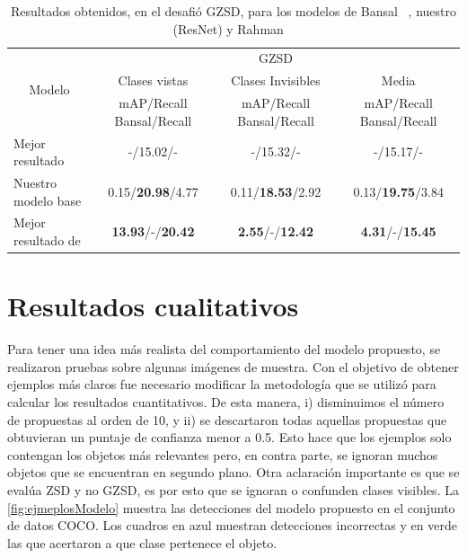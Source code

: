 \begin{table}[]
	\centering
	\resizebox{\textwidth}{!} {
		\begin{tabular}{|l|c|c|c|}
			\hline
			\multicolumn{1}{|c|}{\multirow{3}{*}{Modelo}} & \multicolumn{3}{c|}{GZSD}                                                       \\ \cline{2-4} 
			\multicolumn{1}{|c|}{}                        & Clases vistas             & Clases Invisibles        & Media                    \\ \cline{2-4} 
			\multicolumn{1}{|c|}{}                        & mAP/Recall Bansal/Recall  & mAP/Recall Bansal/Recall & mAP/Recall Bansal/Recall \\ \hline
			Mejor resultado \cite{bansal2018zero}                                        & -/15.02/-                 & -/15.32/-                & -/15.17/-                \\ \hline
			Nuestro modelo base                              & 0.15/\textbf{20.98}/4.77           & 0.11/\textbf{18.53}/2.92          & 0.13/\textbf{19.75}/3.84           \\ \hline
			Mejor resultado de \cite{rahman2020zero}     & \textbf{13.93}/-/\textbf{20.42}             & \textbf{2.55}/-/\textbf{12.42}             & \textbf{4.31}/-/\textbf{15.45}             \\ \hline
		\end{tabular}
	}
	\caption{Resultados obtenidos, en el desafió GZSD, para los modelos de Bansal \etal~\cite{bansal2018zero}, nuestro (ResNet) y Rahman \etal~\cite{rahman2020zero}}
	\label{tab:resultados-gzsd}
\end{table}
\newpage

\section{Resultados cualitativos} \label{sec:resultadoscualitativos}

Para tener una idea más realista del comportamiento del modelo propuesto, se realizaron pruebas sobre algunas imágenes de muestra. Con el objetivo de obtener ejemplos más claros fue necesario modificar la metodología que se utilizó para calcular los resultados cuantitativos. De esta manera, i) disminuimos el número de propuestas al orden de 10, y ii) se descartaron todas aquellas propuestas que obtuvieran un puntaje de confianza menor a 0.5. Esto hace que los ejemplos solo contengan los objetos más relevantes pero, en contra parte, se ignoran muchos objetos que se encuentran en segundo plano. Otra aclaración importante es que se evalúa ZSD y no GZSD, es por esto que se ignoran o confunden clases visibles. La \autoref{fig:ejmeplosModelo} muestra las detecciones del modelo propuesto en el conjunto de datos COCO. Los cuadros en azul muestran detecciones incorrectas y en verde las que acertaron a que clase pertenece el objeto.\\

